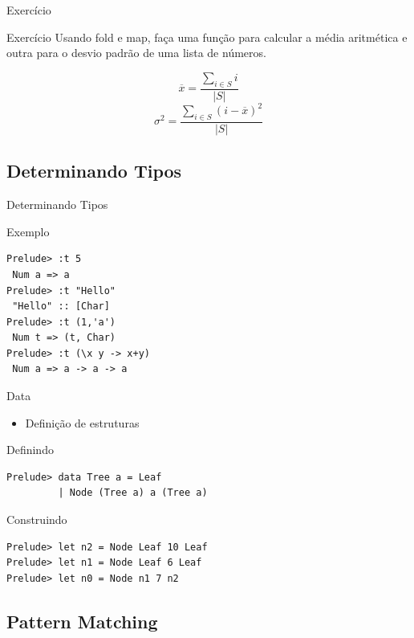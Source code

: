 \documentclass{beamer}
\begin{document}
	\begin{frame}{Exercício}
	 \begin{block}{Exercício}
	  Usando fold e map, faça uma função para calcular a média aritmética e outra para o desvio padrão de uma lista de números. 
	 \end{block}
	 
	  \[ \overline{x} = \frac{\sum\limits_{i \in S}i}{\left|S\right|} \]
	  \[ \sigma^2 = \frac{\sum\limits_{i \in S}(i - \overline{x})^2}{\left|S\right|} \]	 

	\end{frame}
	
	\subsection{Determinando Tipos}
		\begin{frame}[fragile]{Determinando Tipos}
		 \begin{block}{Exemplo}
		 \begin{lstlisting}
Prelude> :t 5
 Num a => a
Prelude> :t "Hello"
 "Hello" :: [Char]
Prelude> :t (1,'a')
 Num t => (t, Char)
Prelude> :t (\x y -> x+y)
 Num a => a -> a -> a
		 \end{lstlisting}
		 \end{block}
		\end{frame}
	
		\begin{frame}[fragile]{Data}
		 
		 \begin{itemize}
		  \item Definição de estruturas
		 \end{itemize}
		 
		 \begin{block}{Definindo}
		  \begin{lstlisting}
Prelude> data Tree a = Leaf 
         | Node (Tree a) a (Tree a)
		  \end{lstlisting}
		 \end{block}		 
		 \begin{block}{Construindo}
		  \begin{lstlisting}
Prelude> let n2 = Node Leaf 10 Leaf
Prelude> let n1 = Node Leaf 6 Leaf
Prelude> let n0 = Node n1 7 n2
		  \end{lstlisting}
		 \end{block}
		\end{frame}
		
		\subsection{Pattern Matching}
		
\end{document}
